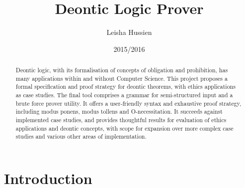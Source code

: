 \documentclass{l4proj}
\begin{document}
\title{Deontic Logic Prover}
\author{Leisha Hussien}
\date{2015/2016}
\maketitle

\begin{abstract}
Deontic logic, with its formalisation of concepts of obligation and prohibition, has many applications within and without Computer Science. This project proposes a formal specification and proof strategy for deontic theorems, with ethics applications as case studies. The final tool comprises a grammar for semi-structured input and a brute force prover utility. It offers a user-friendly syntax and exhaustive proof strategy, including modus ponens, modus tollens and O-necessitation. It succeeds against implemented case studies, and provides thoughtful results for evaluation of ethics applications and deontic concepts, with scope for expansion over more complex case studies and various other areas of implementation. 
\end{abstract}

\educationalconsent

\tableofcontents













\chapter{Introduction}
\end{document}
